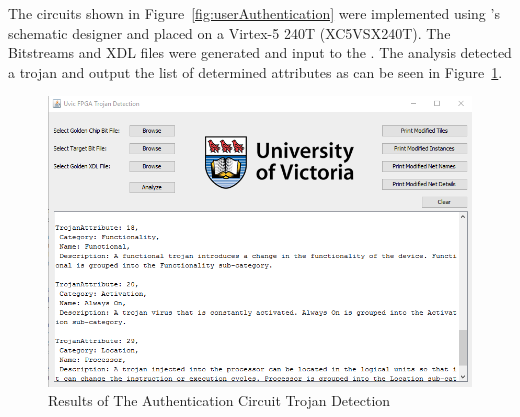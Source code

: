 The circuits shown in Figure~\ref{fig:userAuthentication} were implemented using \Xilinx's schematic designer and placed on a Virtex-5 240T (XC5VSX240T).
The \gls{Bitstream}s and \acrshort{XDL} files were generated and input to the \Name.
The analysis detected a trojan and output the list of determined attributes as can be seen in Figure~\ref{fig:backDoorResult}.
\begin{figure}[h]
\centering
\includegraphics[width=1\linewidth]{Figures/backDoorResult}
\caption[Results of The Authentication Circuit Trojan Detection]{Results of The Authentication Circuit Trojan Detection}
\label{fig:backDoorResult}
\end{figure}

